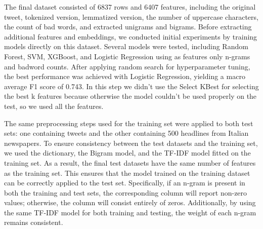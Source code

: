 The final dataset consisted of 6837 rows and 6407 features, including the original tweet, tokenized version, lemmatized version, the number of uppercase characters, the count of bad words, and extracted unigrams and bigrams. Before extracting additional features and embeddings, we conducted initial experiments by training models directly on this dataset.
Several models were tested, including Random Forest, SVM, XGBoost, and Logistic Regression using as features only n-grams and badword counts. After applying random search for hyperparameter tuning, the best performance was achieved with Logistic Regression, yielding a macro average F1 score of 0.743.
In this step we didn’t use the Select KBest for selecting the best k features because otherwise the model couldn’t be used properly on the test, so we used all the features.

The same preprocessing steps used for the training set were applied to both test sets: one containing tweets and the other containing 500 headlines from Italian newspapers. To ensure consistency between the test datasets and the training set, we used the dictionary, the Bigram model, and the TF-IDF model fitted on the training set.
As a result, the final test datasets have the same number of features as the training set. This ensures that the model trained on the training dataset can be correctly applied to the test set. Specifically, if an n-gram is present in both the training and test sets, the corresponding column will report non-zero values; otherwise, the column will consist entirely of zeros. Additionally, by using the same TF-IDF model for both training and testing, the weight of each n-gram remains consistent.
